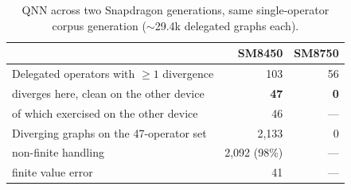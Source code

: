 \begin{table}[t]
\begin{table}[t]
\centering
\small
\caption{QNN across two Snapdragon generations, same single-operator corpus generation
($\sim$29.4k delegated graphs each).}
\label{tab:qnn-gen}
\begin{tabular}{lrr}
\toprule
 & SM8450 & SM8750 \\
\midrule
Delegated operators with $\ge 1$ divergence      & 103 & 56 \\
\quad diverges here, clean on the other device   & \textbf{47} & \textbf{0} \\
\quad\quad of which exercised on the other device & 46 & --- \\
Diverging graphs on the 47-operator set          & 2{,}133 & 0 \\
\quad non-finite handling                        & 2{,}092 (98\%) & --- \\
\quad finite value error                         & 41 & --- \\
\bottomrule
\end{tabular}
\end{table}


\end{table}
